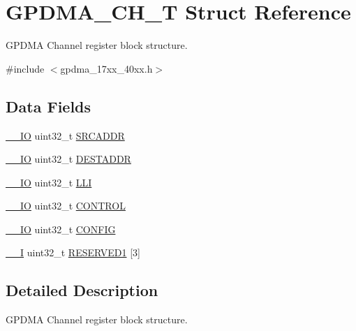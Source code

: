 \hypertarget{structGPDMA__CH__T}{\section{G\-P\-D\-M\-A\-\_\-\-C\-H\-\_\-\-T Struct Reference}
\label{structGPDMA__CH__T}
}


G\-P\-D\-M\-A Channel register block structure.  




{\ttfamily \#include $<$gpdma\-\_\-17xx\-\_\-40xx.\-h$>$}

\subsection*{Data Fields}
\begin{DoxyCompactItemize}
\item 
\hyperlink{core__cm3_8h_aec43007d9998a0a0e01faede4133d6be}{\-\_\-\-\_\-\-I\-O} uint32\-\_\-t \hyperlink{structGPDMA__CH__T_a734e1803144cdaa3cfab1507fa4f05d9}{S\-R\-C\-A\-D\-D\-R}
\item 
\hyperlink{core__cm3_8h_aec43007d9998a0a0e01faede4133d6be}{\-\_\-\-\_\-\-I\-O} uint32\-\_\-t \hyperlink{structGPDMA__CH__T_ab61baba3fc08a7ba4b0502d043ed6ccd}{D\-E\-S\-T\-A\-D\-D\-R}
\item 
\hyperlink{core__cm3_8h_aec43007d9998a0a0e01faede4133d6be}{\-\_\-\-\_\-\-I\-O} uint32\-\_\-t \hyperlink{structGPDMA__CH__T_a240936dbac9f3a949572b3dd196bd83f}{L\-L\-I}
\item 
\hyperlink{core__cm3_8h_aec43007d9998a0a0e01faede4133d6be}{\-\_\-\-\_\-\-I\-O} uint32\-\_\-t \hyperlink{structGPDMA__CH__T_a7b2997d55e2bbe71c2f99d5879ca75c3}{C\-O\-N\-T\-R\-O\-L}
\item 
\hyperlink{core__cm3_8h_aec43007d9998a0a0e01faede4133d6be}{\-\_\-\-\_\-\-I\-O} uint32\-\_\-t \hyperlink{structGPDMA__CH__T_a4f74d11c01d0d3203ceeebd9db2a50a8}{C\-O\-N\-F\-I\-G}
\item 
\hyperlink{core__cm3_8h_af63697ed9952cc71e1225efe205f6cd3}{\-\_\-\-\_\-\-I} uint32\-\_\-t \hyperlink{structGPDMA__CH__T_ae6a0ee831032674d792f9da150e3025e}{R\-E\-S\-E\-R\-V\-E\-D1} \mbox{[}3\mbox{]}
\end{DoxyCompactItemize}


\subsection{Detailed Description}
G\-P\-D\-M\-A Channel register block structure. 

